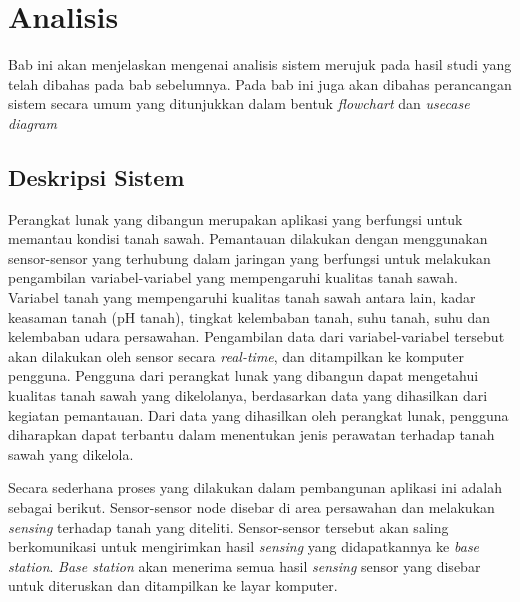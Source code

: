 \chapter{Analisis}
\label{chap:analisis}

Bab ini akan menjelaskan mengenai analisis sistem merujuk pada hasil studi yang telah dibahas pada bab sebelumnya. Pada bab ini juga akan dibahas perancangan sistem secara umum yang ditunjukkan dalam bentuk \textit{flowchart} dan \textit{usecase diagram}

\section{Deskripsi Sistem}
\label{sec:skripsi} 
  
   Perangkat lunak yang dibangun merupakan aplikasi yang berfungsi untuk memantau kondisi tanah sawah. Pemantauan dilakukan dengan menggunakan sensor-sensor yang terhubung dalam jaringan yang berfungsi untuk melakukan pengambilan variabel-variabel yang mempengaruhi kualitas tanah sawah. Variabel tanah yang mempengaruhi kualitas tanah sawah antara lain, kadar keasaman tanah (pH tanah), tingkat kelembaban tanah, suhu tanah, suhu dan kelembaban udara persawahan. Pengambilan data dari variabel-variabel tersebut akan dilakukan oleh sensor secara \textit{real-time}, dan ditampilkan ke komputer pengguna. Pengguna dari perangkat lunak yang dibangun dapat mengetahui kualitas tanah sawah yang dikelolanya, berdasarkan data yang dihasilkan dari kegiatan pemantauan. Dari data yang dihasilkan oleh perangkat lunak, pengguna diharapkan dapat terbantu dalam menentukan jenis perawatan terhadap tanah sawah yang dikelola.
   
   
   Secara sederhana proses yang dilakukan dalam pembangunan aplikasi ini adalah sebagai berikut. Sensor-sensor node disebar di area persawahan dan melakukan \textit{sensing} terhadap tanah yang diteliti. Sensor-sensor tersebut akan saling berkomunikasi untuk mengirimkan hasil \textit{sensing} yang didapatkannya ke \textit{base station}. \textit{Base station} akan menerima semua hasil \textit{sensing} sensor yang disebar untuk diteruskan dan ditampilkan ke layar komputer.
  
